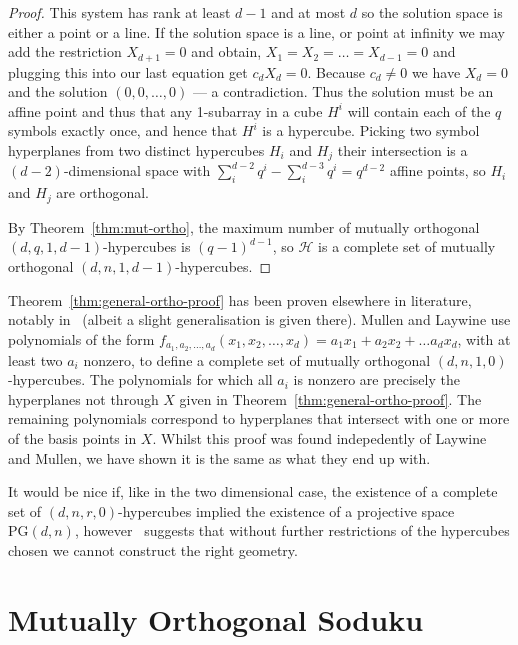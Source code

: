\documentclass{article}
\newcommand{\PG}{\mathrm{PG}}
\begin{document}
\begin{proof}
  This system has rank at least \(d - 1\) and at most \(d\) so the solution space is either a point or a line. If the solution space is a line, or point at infinity we may add the restriction \(X_{d + 1} = 0\) and obtain,
  \(X_1 = X_2 = \ldots = X_{d - 1} = 0\) and plugging this into our last equation get \(c_d X_d = 0\). Because \(c_d \neq 0\) we have \(X_d = 0\) and the solution \((0, 0, \ldots, 0)\) --- a contradiction. Thus the solution must be an affine point and thus that any 1-subarray in a cube \(H^{i}\) will contain each of the \(q\) symbols exactly once, and hence that \(H^{i}\) is a hypercube.
  Picking two symbol hyperplanes from two distinct hypercubes \(H_{i}\) and \(H_{j}\) their intersection is a \((d - 2)\)-dimensional space with \(\sum_i^{d - 2} q^{i} - \sum_i^{d - 3} q^{i} = q^{d - 2}\) affine points, so \(H_{i}\) and \(H_{j}\) are orthogonal.

  By Theorem~\ref{thm:mut-ortho}, the maximum number of mutually orthogonal \((d, q, 1, d - 1)\)-hypercubes is \((q - 1)^{d - 1}\), so \(\mathcal{H}\) is a complete set of mutually orthogonal \((d, n, 1, d - 1)\)-hypercubes.
\end{proof}


Theorem~\ref{thm:general-ortho-proof} has been proven elsewhere in literature, notably in~\cite{MR1644242} (albeit a slight generalisation is given there). Mullen and Laywine use polynomials of the form \(f_{a_1, a_2, \ldots, a_d}(x_1, x_2, \ldots, x_d) = a_1x_1 + a_2x_2 + \ldots a_d x_d\), with at least two \(a_i\) nonzero, to define a complete set of mutually orthogonal \((d, n, 1, 0)\)-hypercubes.
The polynomials for which all \(a_i\) is nonzero are precisely the hyperplanes not through \(X\) given in Theorem~\ref{thm:general-ortho-proof}. The remaining polynomials correspond to hyperplanes that intersect with one or more of the basis points in \(X\). Whilst this proof was found indepedently of Laywine and Mullen,
we have shown it is the same as what they end up with.

It would be nice if, like in the two dimensional case, the existence of a complete set of \((d,n,r,0)\)-hypercubes implied the existence of a projective space \(\PG(d, n)\), 
however~\cite{morgan2000affine} suggests that without further restrictions of the hypercubes chosen we cannot construct the right geometry.

\section{Mutually Orthogonal Soduku}
\end{document}
